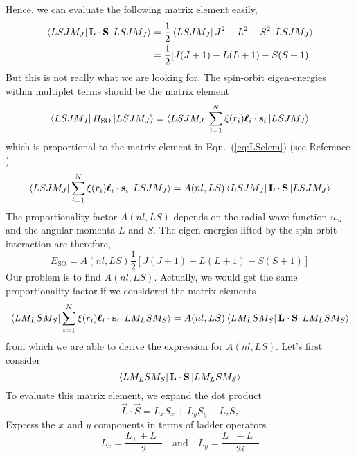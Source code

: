 %
Hence, we can evaluate the following matrix element easily,
\begin{align} \label{eq:LSelem}
\Bra{LSJM_J}\vec{L}\cdot\vec{S}\Ket{LSJM_J} & = \frac{1}{2}\Bra{LSJM_J}J^2-L^2-S^2\Ket{LSJM_J} \nonumber \\
& = \frac{1}{2}[J(J+1)-L(L+1)-S(S+1)]
\end{align}
%
But this is not really what we are looking for. The spin-orbit eigen-energies
within multiplet terms should be the matrix element
\begin{equation} \label{eq:HSOelem}
\Bra{LSJM_J}H_\text{SO}\Ket{LSJM_J} = \Bra{LSJM_J} \sum_{i=1}^N \xi(r_i) \boldsymbol{\ell}_i\cdot\vec{s}_i \Ket{LSJM_J}
\end{equation}
which is proportional to the matrix element in Eqn.~(\ref{eq:LSelem}) (see Reference \cite{WB})
\begin{equation} \label{eq:HSOpropLS}
\Bra{LSJM_J} \sum_{i=1}^N \xi(r_i) \boldsymbol{\ell}_i\cdot\vec{s}_i \Ket{LSJM_J}
= A(nl,LS) \Bra{LSJM_J}\vec{L}\cdot\vec{S}\Ket{LSJM_J}
\end{equation}
%
The proportionality factor $A(nl,LS)$ depends on the radial wave function $u_{nl}$ and the
angular momenta $L$ and $S$. The eigen-energies lifted by the spin-orbit interaction are therefore,
\begin{equation} \label{eq:ESO}
\boxed{
E_\text{SO} = A(nl,LS) \frac{1}{2}[J(J+1)-L(L+1)-S(S+1)]
}
\end{equation}
%
Our problem is to find $A(nl,LS)$. Actually, we would
get the same proportionality factor if we considered the matrix elements
\begin{equation} \label{eq:HSOpropLS2}
\Bra{LM_LSM_S} \sum_{i=1}^N \xi(r_i) \boldsymbol{\ell}_i\cdot\vec{s}_i \Ket{LM_LSM_S}
= A(nl,LS) \Bra{LM_LSM_S}\vec{L}\cdot\vec{S}\Ket{LM_LSM_S}
\end{equation}
from which we are able to derive the expression for $A(nl,LS)$.
Let's first consider
\begin{equation*}
\Bra{LM_LSM_S}\vec{L}\cdot\vec{S}\Ket{LM_LSM_S}
\end{equation*}
To evaluate this matrix element, we expand the dot product
\begin{equation} \label{eq:LSdot}
\vec{L}\cdot\vec{S} = L_xS_x + L_yS_y + L_zS_z
\end{equation}
Express the $x$ and $y$ components in terms of ladder operators
\begin{equation} \label{eq:LxyLadder}
L_x = \frac{L_++L_-}{2} \quad \text{and} \quad L_y = \frac{L_+-L_-}{2i}
\end{equation}
